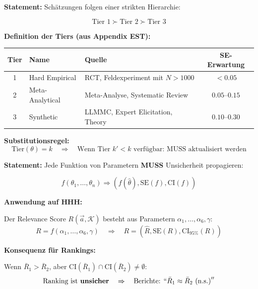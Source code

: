 \begin{tcolorbox}[colback=gray!5!white, colframe=gray!75!black,
    title=\textbf{Axiom EI-2: Tier Hierarchy}]

\textbf{Statement:} Schätzungen folgen einer strikten Hierarchie:

\begin{equation}
\boxed{\text{Tier 1} \succ \text{Tier 2} \succ \text{Tier 3}}
\end{equation}

\textbf{Definition der Tiers (aus Appendix EST):}

\renewcommand{\arraystretch}{1.3}
\begin{center}
\begin{tabular}{@{}clp{6cm}c@{}}
\toprule
\textbf{Tier} & \textbf{Name} & \textbf{Quelle} & \textbf{SE-Erwartung} \\
\midrule
1 & Hard Empirical & RCT, Feldexperiment mit $N > 1000$ & $< 0.05$ \\
2 & Meta-Analytical & Meta-Analyse, Systematic Review & $0.05$--$0.15$ \\
3 & Synthetic & LLMMC, Expert Elicitation, Theory & $0.10$--$0.30$ \\
\bottomrule
\end{tabular}
\end{center}

\textbf{Substitutionsregel:}
\begin{equation}
\text{Tier}(\theta) = k \quad \Rightarrow \quad \text{Wenn Tier } k' < k \text{ verfügbar: } \text{MUSS aktualisiert werden}
\end{equation}

\end{tcolorbox}

\begin{tcolorbox}[colback=gray!5!white, colframe=gray!75!black,
    title=\textbf{Axiom EI-3: Uncertainty Propagation Requirement}]

\textbf{Statement:} Jede Funktion von Parametern \textbf{MUSS} Unsicherheit propagieren:

\begin{equation}
\boxed{f(\theta_1, \ldots, \theta_n) \Rightarrow (f(\hat{\theta}), \text{SE}(f), \text{CI}(f))}
\end{equation}

\textbf{Anwendung auf HHH:}

Der Relevance Score $R(\vec{a}, \mathcal{K})$ besteht aus Parametern $\alpha_1, \ldots, \alpha_6, \gamma$:
\begin{equation}
R = f(\alpha_1, \ldots, \alpha_6, \gamma) \quad \Rightarrow \quad R = (\hat{R}, \text{SE}(R), \text{CI}_{95\%}(R))
\end{equation}

\textbf{Konsequenz für Rankings:}

Wenn $\bar{R}_1 > \bar{R}_2$, aber $\text{CI}(\bar{R}_1) \cap \text{CI}(\bar{R}_2) \neq \emptyset$:
\begin{equation}
\text{Ranking ist } \textbf{unsicher} \quad \Rightarrow \quad \text{Berichte: } ``\bar{R}_1 \approx \bar{R}_2 \text{ (n.s.)}''
\end{equation}

\end{tcolorbox}

